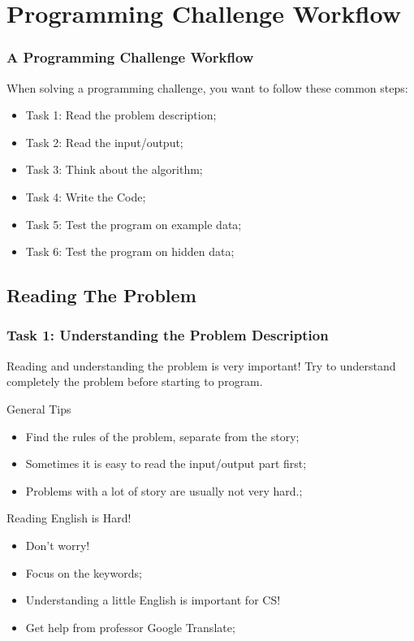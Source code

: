 \section{Programming Challenge Workflow}
\begin{frame}
  \frametitle{A Programming Challenge Workflow}

  When solving a programming challenge, you want to follow
  these common steps:
  \bigskip

  \begin{itemize}
  \item Task 1: Read the problem description;
  \item Task 2: Read the input/output;
  \item Task 3: Think about the algorithm;
  \item Task 4: Write the Code;
  \item Task 5: Test the program on example data;
  \item Task 6: Test the program on hidden data;
  \end{itemize}
\end{frame}


\subsection{Reading The Problem}
\begin{frame}
  \frametitle{Task 1: Understanding the Problem Description}

  Reading and understanding the problem is very important! Try to
  understand completely the problem before starting to program.
  \bigskip

  \begin{block}{General Tips}
  \begin{itemize}
  \item Find the \alert{rules} of the problem, separate from the \alert{story};
  \item Sometimes it is easy to read the input/output part first;
  \item Problems with a lot of \alert{story} are usually not very hard.;
\end{itemize}
  \end{block}

  \begin{alertblock}{Reading English is Hard!}
    \begin{itemize}
      \item Don't worry!
      \item Focus on the keywords;
      \item Understanding a little English is important for CS!
      \item Get help from professor Google Translate;
    \end{itemize}
  \end{alertblock}
\end{frame}

